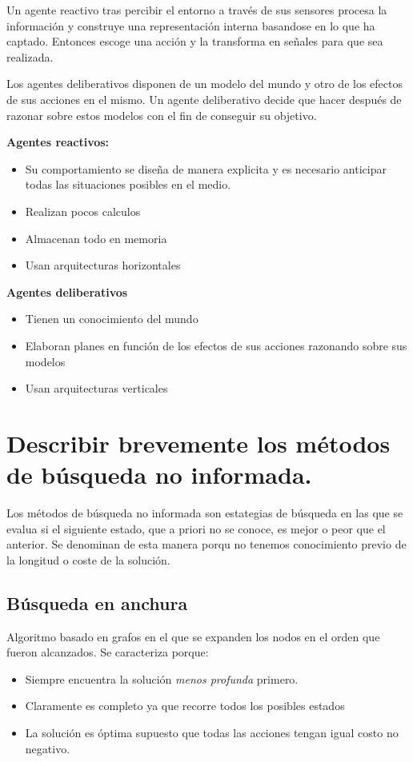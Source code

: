 \documentclass[12pt]{article}
\begin{document}
Un agente reactivo tras percibir el entorno a través de sus sensores
procesa la información y construye una representación interna
basandose en lo que ha captado. Entonces escoge una acción y la
transforma en señales para que sea realizada.

Los agentes deliberativos disponen de un modelo del mundo y otro de
los efectos de sus acciones en el mismo. Un agente deliberativo decide
que hacer después de razonar sobre estos modelos con el fin de
conseguir su objetivo.

\textbf{Agentes reactivos:}
\begin{itemize}
\item Su comportamiento se diseña de manera explicita y es necesario
  anticipar todas las situaciones posibles en el medio.
\item Realizan pocos calculos
\item Almacenan todo en memoria
\item Usan arquitecturas horizontales
\end{itemize}

\textbf{Agentes deliberativos}
\begin{itemize}
\item Tienen un conocimiento del mundo
\item Elaboran planes en función de los efectos de sus acciones razonando sobre sus modelos
\item Usan arquitecturas verticales
\end{itemize}

\section{Describir brevemente los métodos de búsqueda no informada.}

Los métodos de búsqueda no informada son estategias de búsqueda en las
que se evalua si el siguiente estado, que a priori no se conoce, es
mejor o peor que el anterior. Se denominan de esta manera porqu no
tenemos conocimiento previo de la longitud o coste de la solución.

\subsection{Búsqueda en anchura}

Algoritmo basado en grafos en el que se expanden los nodos en el orden
que fueron alcanzados. Se caracteriza porque:

\begin{itemize}
\item Siempre encuentra la solución \textit{menos profunda} primero.
\item Claramente es completo ya que recorre todos los posibles estados
\item La solución es óptima supuesto que todas las acciones tengan
  igual costo no negativo.
\end{itemize}
\end{document}
